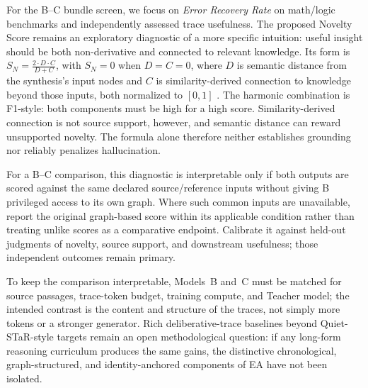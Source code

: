 For the B--C bundle screen, we focus on \emph{Error Recovery Rate} on
math/logic benchmarks and independently assessed trace usefulness. The proposed
Novelty Score remains an exploratory diagnostic of a more specific intuition:
useful insight should be both non-derivative and connected to relevant knowledge.
Its form is $S_N = \frac{2 \cdot D \cdot C}{D + C}$, with $S_N=0$ when
$D=C=0$, where $D$ is semantic distance from the synthesis's input nodes and
$C$ is similarity-derived connection to knowledge beyond those inputs, both
normalized to $[0,1]$ \cite{westerberg2026understanding}. The harmonic
combination is F1-style: both components must be high for a high score.
Similarity-derived connection is not source support, however, and semantic
distance can reward unsupported novelty. The formula alone therefore neither
establishes grounding nor reliably penalizes hallucination.

For a B--C comparison, this diagnostic is interpretable only if both outputs
are scored against the same declared source/reference inputs without giving B
privileged access to its own graph. Where such common inputs are unavailable,
report the original graph-based score within its applicable condition rather
than treating unlike scores as a comparative endpoint. Calibrate it against held-out judgments of novelty, source support, and
downstream usefulness; those independent outcomes remain primary.

To keep the
comparison interpretable, Models~B and~C must be matched for source passages,
trace-token budget, training compute, and Teacher model; the intended contrast
is the content and structure of the traces, not simply more tokens or a
stronger generator. Rich deliberative-trace baselines beyond Quiet-STaR-style
targets remain an open methodological question: if any long-form reasoning
curriculum produces the same gains, the distinctive chronological, graph-structured,
and identity-anchored components of EA have not been isolated.

